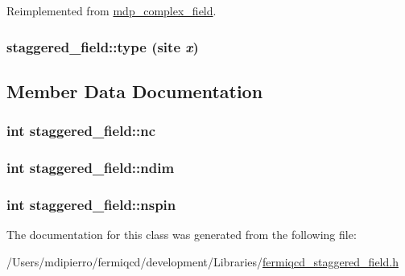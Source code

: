 Reimplemented from \hyperlink{classmdp__complex__field_ad2b736ae31e3ee1f955c10f6ad40928f}{mdp\_\-complex\_\-field}.\hypertarget{classstaggered__field_a5e53f3e9e5c268dde3e3f2eb9e64befa}{
\subsubsection[{type}]{ staggered\_\-field::type (site {\em x})}}
\label{classstaggered__field_a5e53f3e9e5c268dde3e3f2eb9e64befa}


\subsection{Member Data Documentation}
\hypertarget{classstaggered__field_a4ac408eebebb6b76ac209479df87459a}{
\subsubsection[{nc}]{\setlength{\rightskip}{0pt plus 5cm}int {\bf staggered\_\-field::nc}}}
\label{classstaggered__field_a4ac408eebebb6b76ac209479df87459a}
\hypertarget{classstaggered__field_a52eed99381c8e8649c6e79ec0fe7a4b8}{
\subsubsection[{ndim}]{\setlength{\rightskip}{0pt plus 5cm}int {\bf staggered\_\-field::ndim}}}
\label{classstaggered__field_a52eed99381c8e8649c6e79ec0fe7a4b8}
\hypertarget{classstaggered__field_aac06f4fadf069a57cda02bec2ecd8bda}{
\subsubsection[{nspin}]{\setlength{\rightskip}{0pt plus 5cm}int {\bf staggered\_\-field::nspin}}}
\label{classstaggered__field_aac06f4fadf069a57cda02bec2ecd8bda}


The documentation for this class was generated from the following file:\begin{DoxyCompactItemize}
\item 
/Users/mdipierro/fermiqcd/development/Libraries/\hyperlink{fermiqcd__staggered__field_8h}{fermiqcd\_\-staggered\_\-field.h}\end{DoxyCompactItemize}

